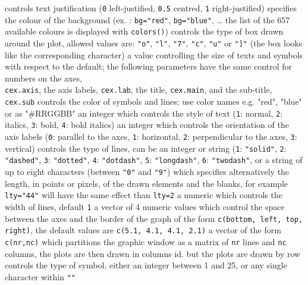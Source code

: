 {	{controls text justification ({\tt 0} left-justified, {\tt 0.5} centred, {\tt 1} right-justified)}
	{specifies the colour of the background (ex. : {\tt bg="red"}, {\tt bg="blue"}, \ldots{} the list of the 657 available colours is displayed with {\tt colors()})}
	{controls the type of box drawn around the plot, allowed values
    are: {\tt "o"}, {\tt "l"}, {\tt "7"}, {\tt "c"}, {\tt "u"} or {\tt "]"} (the box looks like the corresponding character)}
	{ a value controlling the size of texts and symbols with respect to the default; the following parameters have the same control for numbers on the axes,\\
    {\tt cex.axis}, the axis labels, {\tt cex.lab}, the title, {\tt cex.main},
    and the sub-title, {\tt cex.sub}}
	{controls the color of symbols and lines; use color names e.g. "red", "blue" or as "\#RRGGBB"}
	{an integer which controls the style of text ({\tt 1}: normal, {\tt 2}: italics, {\tt 3}: bold, {\tt 4}: bold italics)}
	{ an integer which controls the orientation of the axis labels ({\tt 0}: parallel to the axes, {\tt 1}: horizontal, {\tt 2}: perpendicular to the axes, {\tt 3}: vertical)}
	{controls the type of lines, can be an integer or string ({\tt 1}: {\tt "solid"}, {\tt 2}: {\tt "dashed"}, {\tt 3}: {\tt "dotted"}, {\tt 4}: {\tt "dotdash"}, {\tt 5}: {\tt "longdash"}, {\tt 6}: {\tt "twodash"}, or a string of up to eight characters (between {\tt "0"} and {\tt "9"}) which specifies alternatively the length, in points or pixels, of the drawn elements and the blanks, for example {\tt lty="44"} will have the same effect than {\tt lty=2}}
	{ a numeric which controls the width of lines, default {\tt 1}}
	{ a vector of 4 numeric values which control the space between the axes and the border of the graph of the form {\tt c(bottom, left, top, right)}, the default values are {\tt c(5.1, 4.1, 4.1, 2.1)}}
	{a vector of the form {\tt c(nr,nc)} which partitions the graphic window as a matrix of {\tt nr} lines and {\tt nc} columns, the plots are then drawn in columns}
	{ id. but the plots are drawn by row}
	{ controls the type of symbol, either an integer between 1 and 25, or any single character within {\tt ""}}

}

